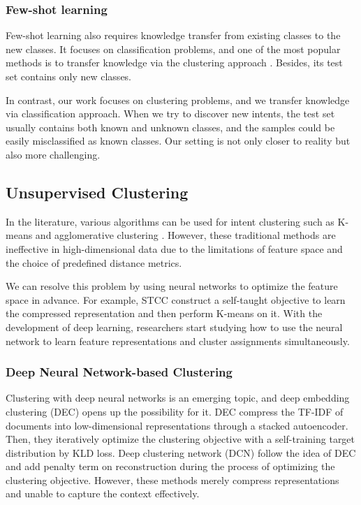 \documentclass[letterpaper]{article} \usepackage{aaai20}  \usepackage{times}  \usepackage{helvet} \usepackage{courier}  \usepackage[hyphens]{url}  \usepackage{graphicx} \urlstyle{rm} \def\UrlFont{\rm}  \usepackage{graphicx}  \frenchspacing  \setlength{\pdfpagewidth}{8.5in}  \setlength{\pdfpageheight}{11in}
\begin{document}
\subsubsection{Few-shot learning}
Few-shot learning also requires knowledge transfer from existing classes to the new classes. It focuses on classification problems, and one of the most popular methods is to transfer knowledge via the clustering approach \cite{snell2017prototypical}. Besides, its test set contains only new classes.

In contrast, our work focuses on clustering problems, and we transfer knowledge via classification approach. When we try to discover new intents, the test set usually contains both known and unknown classes, and the samples could be easily misclassified as known classes. Our setting is not only closer to reality but also more challenging.

\subsection{Unsupervised Clustering}
In the literature, various algorithms can be used for intent clustering such as K-means \cite{macqueen1967some} and agglomerative clustering \cite{gowda1978agglomerative}. However, these traditional methods are ineffective in high-dimensional data due to the limitations of feature space and the choice of predefined distance metrics. 

We can resolve this problem by using neural networks to optimize the feature space in advance. For example, STCC \cite{xu-etal-2015-short} construct a self-taught objective to learn the compressed representation and then perform K-means on it. With the development of deep learning, researchers start studying how to use the neural network to learn feature representations and cluster assignments simultaneously.

\subsubsection{Deep Neural Network-based Clustering} 
Clustering with deep neural networks is an emerging topic, and deep embedding clustering (DEC) \cite{xie2016unsupervised} opens up the possibility for it. DEC compress the TF-IDF of documents into low-dimensional representations through a stacked autoencoder. Then, they iteratively optimize the clustering objective with a self-training target distribution by KLD loss. Deep clustering network (DCN) \cite{yang2017towards} follow the idea of DEC and add penalty term on reconstruction during the process of optimizing the clustering objective. However, these methods merely compress representations and unable to capture the context effectively.
\end{document}
